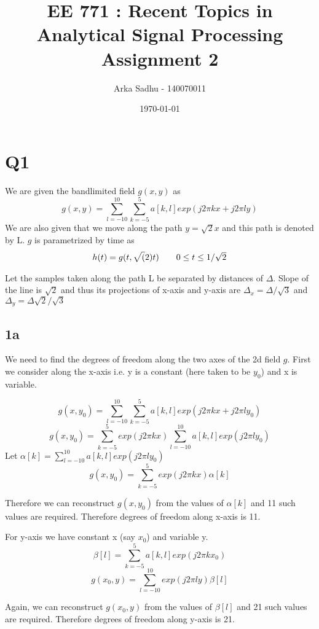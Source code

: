 \documentclass{article}
\title{EE 771 : Recent Topics in Analytical Signal Processing Assignment 2}
\author{Arka Sadhu - 140070011}
\date{\today}
\begin{document}
\maketitle

\section*{Q1}
We are given the bandlimited field $g(x, y)$ as
$$g(x,y) = \sum_{l=-10}^{10}\sum_{k=-5}^{5} a[k, l] exp(j2\pi kx + j2\pi ly)$$
We are also given that we move along the path $y = \sqrt{2}x$ and this path is denoted by L. $g$ is parametrized by time as
\begin{align}
  \label{eq:1}
  h(t) = g(t, \sqrt(2)t) \tag*{$0 \le t \le 1/\sqrt{2}$}
\end{align}

Let the samples taken along the path L be separated by distances of $\Delta$. Slope of the line is $\sqrt{2}$ and thus its projections of x-axis and y-axis are $\Delta_x = \Delta / \sqrt{3} $ and $\Delta_y = \Delta \sqrt{2} / \sqrt{3}$

\subsection*{1a}
We need to find the degrees of freedom along the two axes of the 2d field $g$. First we consider along the x-axis i.e. y is a constant (here taken to be $y_0$) and x is variable.

$$g(x, y_0) = \sum_{l=-10}^{10} \sum_{k=-5}^5a[k, l] exp(j2 \pi kx + j2\pi ly_0)$$
$$g(x, y_0) = \sum_{k=-5}^{5} exp(j2 \pi kx) \sum_{l=-10}^{10} a[k, l] exp(j2\pi ly_0)$$
Let $\alpha [k] = \sum_{l=-10}^{10}a[k, l] exp(j2\pi ly_0)$
\begin{equation}
  \label{eq:gy0}
  g(x, y_0) = \sum_{k=-5}^{5} exp(j2 \pi kx) \alpha[k]
\end{equation}

Therefore we can reconstruct $g(x, y_0)$ from the values of $\alpha[k]$ and 11 such values are required. Therefore degrees of freedom along x-axis is 11.

For y-axis we have constant x (say $x_0$) and variable y.
$$\beta[l] = \sum_{k=-5}^5 a[k,l] exp(j2\pi kx_0)$$
\begin{equation}
  \label{eq:gx0}
  g(x_0, y) = \sum_{l=-10}^{10}exp(j2 \pi ly) \beta[l]
\end{equation}

Again, we can reconstruct $g(x_0, y)$ from the values of $\beta[l]$ and 21 such values are required. Therefore degrees of freedom along y-axis is 21.
\end{document}
